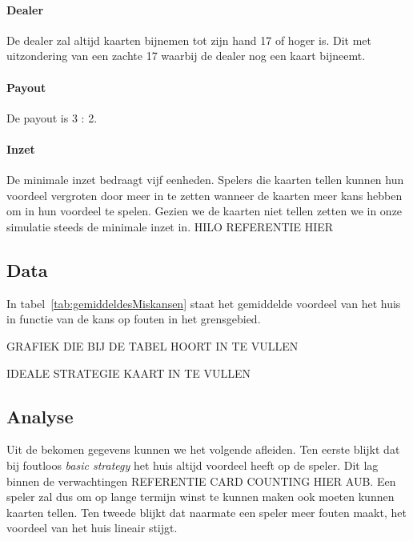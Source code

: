 \documentclass[conference]{IEEEtran}
\begin{document}
\paragraph{Dealer}
De dealer zal altijd kaarten bijnemen tot zijn hand 17 of hoger is. Dit met uitzondering van een zachte 17 waarbij de dealer nog een kaart bijneemt.
\paragraph{Payout}
De payout is 3 : 2.
\paragraph{Inzet}
De minimale inzet bedraagt vijf eenheden. Spelers die kaarten tellen kunnen hun voordeel vergroten door meer in te zetten wanneer de kaarten meer kans hebben om in hun voordeel te spelen. Gezien we de kaarten niet tellen zetten we in onze simulatie steeds de minimale inzet in.  HILO REFERENTIE HIER


\subsection{Data}
In tabel~\ref{tab:gemiddeldesMiskansen} staat het gemiddelde voordeel van het huis in functie van de kans op fouten in het grensgebied.

GRAFIEK DIE BIJ DE TABEL HOORT IN TE VULLEN

IDEALE STRATEGIE KAART IN TE VULLEN

\subsection{Analyse}
Uit de bekomen gegevens kunnen we het volgende afleiden. Ten eerste blijkt dat bij foutloos \textit{basic strategy} het huis altijd voordeel heeft op de speler. Dit lag binnen de verwachtingen REFERENTIE CARD COUNTING HIER AUB. Een speler zal dus om op lange termijn winst te kunnen maken ook moeten kunnen kaarten tellen. Ten tweede blijkt dat naarmate een speler meer fouten maakt, het voordeel van het huis lineair stijgt.
\end{document}
